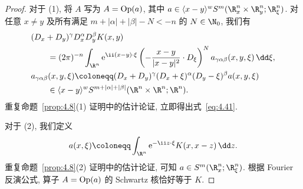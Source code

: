 \begin{proof}
对于 (1), 将 $A$ 写为 $A = \operatorname{Op}(a)$, 其中 $a \in \langle x - y \rangle^w S^m(\R^n_x \times \R^n_y; \R^n_\xi)$. 对任意 $x \neq y$ 及所有满足 $m + |\alpha| + |\beta| - N < -n$ 的 $N \in \N_0$, 我们有
\begin{equation}\label{eq:4.43}
    \begin{aligned}
        &(D_x + D_y)^\gamma D_x^\alpha D_y^\beta K(x, y) \\
        &\qquad = (2\pi)^{-n} \int_{\R^n} \ee^{\ii(x-y)\cdot\xi} \left( -\frac{x-y}{|x-y|^2} \cdot D_\xi \right)^N a_{\gamma\alpha\beta}(x, y, \xi) \,\dd\xi, \\
        &a_{\gamma\alpha\beta}(x, y, \xi) \defeq (D_x + D_y)^\gamma (D_x + \xi)^\alpha (D_y - \xi)^\beta a(x, y, \xi) \\
        &\qquad \in \langle x - y \rangle^w S^{m+|\alpha|+|\beta|}(\R^n \times \R^n; \R^n).
    \end{aligned}
\end{equation}
重复命题~\ref{prop:4.8}(1) 证明中的估计论证, 立即得出式~\eqref{eq:4.41}.

对于 (2), 我们定义
\begin{equation}\label{eq:4.44}
    a(x, \xi) \defeq \int_{\R^n} \ee^{-\ii z \cdot \xi} K(x, x - z) \,\dd z.
\end{equation}
重复命题~\ref{prop:4.8}(2) 证明中的估计论证, 可知 $a \in S^m(\R^n_x; \R^n_\xi)$. 根据 Fourier 反演公式, 算子 $A = \operatorname{Op}(a)$ 的 Schwartz 核恰好等于 $K$.
\end{proof}

